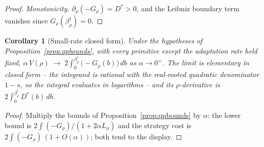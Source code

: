 \documentclass[11pt]{article}
\newtheorem{corollary}[theorem]{Corollary}
\theoremstyle{definition}
\theoremstyle{remark}
\numberwithin{equation}{section}
\begin{document}
\begin{proof}
\emph{Monotonicity.} $\partial_\rho(-G_\rho) = D^\ast > 0$, and the Leibniz boundary term vanishes since $G_\rho(\beta^\dagger_\rho) = 0$.
\end{proof}

\begin{corollary}[Small-rate closed form]\label{cor:qplimit}
Under the hypotheses of Proposition~\ref{prop:qpbounds}, with every primitive except the adaptation rate held fixed, $\displaystyle \alpha\,V(\rho)\;\longrightarrow\;2\int_0^{\beta^\dagger_\rho}\bigl(-G_\rho(b)\bigr)\,db$ as $\alpha\to0^+$. The limit is elementary in closed form -- the integrand is rational with the real-rooted quadratic denominator $1-s$, so the integral evaluates in logarithms -- and its $\rho$-derivative is $2\int_0^{\beta^\dagger_\rho} D^\ast(b)\,db$.
\end{corollary}
\begin{proof}
Multiply the bounds of Proposition~\ref{prop:qpbounds} by $\alpha$: the lower bound is $2\int(-G_\rho)/(1+2\alpha L_\rho)$ and the strategy cost is $2\int(-G_\rho)\,(1+O(\alpha))$; both tend to the display.
\end{proof}
\end{document}
